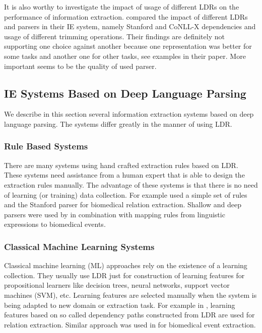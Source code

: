It is also worthy to investigate the impact of usage of different LDRs on the performance of information extraction. \cite{Buyko:2010:EIA:1870658.1870754} compared the impact of different LDRs and parsers in their IE system, namely Stanford and CoNLL-X dependencies and usage of different trimming operations. Their findings are definitely not supporting one choice against another because one representation was better for some tasks and another one for other tasks, see examples in their paper. More important seems to be the quality of used parser.



\subsection{IE Systems Based on Deep Language Parsing} \label{sec:relwork_deep_IE_systems}


We describe in this section several information extraction systems based on deep language parsing. The systems differ greatly in the manner of using LDR.

\subsubsection{Rule Based Systems}

There are many systems using hand crafted extraction rules based on LDR. These systems need assistance from a human expert that is able to design the extraction rules manually. The advantage of these systems is that there is no need of learning (or training) data collection. For example \cite{RelEx} used a simple set of rules and the Stanford parser for biomedical relation extraction. Shallow and deep parsers were used by \cite{Yakushiji2001} in combination with mapping rules from linguistic expressions to biomedical events.


\subsubsection{Classical Machine Learning Systems}

Classical machine learning (ML) approaches rely on the existence of a learning collection. They usually use LDR just for construction of learning features for propositional learners like decision trees, neural networks, support vector machines (SVM), etc. Learning features are selected manually when the system is being adapted to new domain or extraction task. For example in \citep{Bunescu:DependencyPaths}, learning features based on so called dependency paths constructed from LDR are used for relation extraction. Similar approach was used in \citep{Buyko:dependencyGraphs} for biomedical event extraction.


